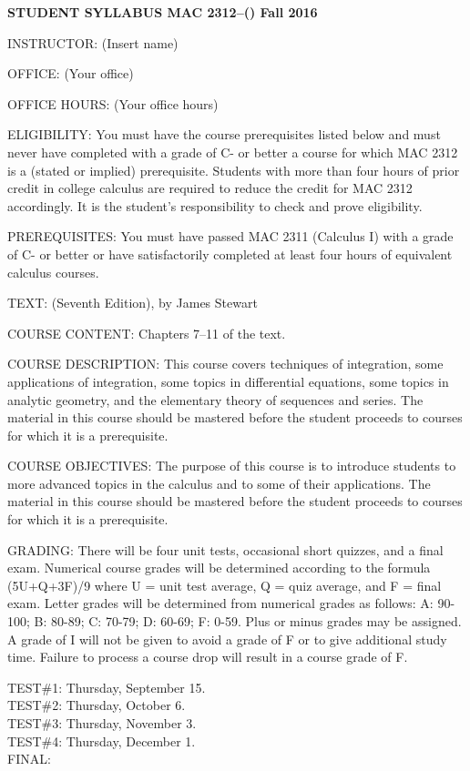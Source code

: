 \documentclass[12pt,oneside]{amsart}
\begin{document}
\centerline{\bf STUDENT SYLLABUS \hfill MAC 2312--() \hfill Fall 2016}

\noindent INSTRUCTOR: (Insert name)

\noindent OFFICE: (Your office)

\noindent OFFICE HOURS: (Your office hours)

\noindent ELIGIBILITY: You must have the course prerequisites listed below and must
never have completed with a grade of C- or better a course for which MAC
2312 is a (stated or implied) prerequisite.  Students with more than four
hours of prior credit in college calculus are required to reduce the
credit for MAC 2312 accordingly. It is the student's responsibility to
check and prove eligibility.


\noindent PREREQUISITES: You must have passed MAC 2311 (Calculus I)  with a grade of
C- or better or have satisfactorily completed at least four hours of
equivalent calculus courses.

\noindent TEXT:  (Seventh Edition), by
James Stewart

\noindent COURSE CONTENT: Chapters 7--11 of the text.

\noindent COURSE DESCRIPTION: This course covers techniques of integration, some applications of integration, some topics in differential equations, some topics in analytic geometry, and the elementary theory of sequences and series. The
material in this course should be mastered before the student proceeds to
courses for which it is a prerequisite.



\noindent COURSE OBJECTIVES: The purpose of this course is to introduce students to
more advanced topics in the calculus and to some of their applications. The
material in this course should be mastered before the student proceeds to
courses for which it is a prerequisite.

\noindent GRADING: There will be four unit tests, occasional short quizzes, and a final exam.
Numerical course grades will be determined according to the
formula (5U+Q+3F)/9 where U = unit test average, Q = quiz average, and F = final exam.
Letter grades will be determined from numerical grades
as follows: A: 90-100; B: 80-89; C: 70-79; D: 60-69; F: 0-59. Plus or
minus grades may be assigned. A grade of I will not be given to avoid a grade of F
or to give additional study time. Failure to process a course drop will
result in a course grade of F.

\noindent TEST\#1: Thursday, September 15.
\\
TEST\#2: Thursday, October 6.
\\
TEST\#3: Thursday, November 3.
\\
TEST\#4: Thursday, December 1.
\\
FINAL:
\end{document}
